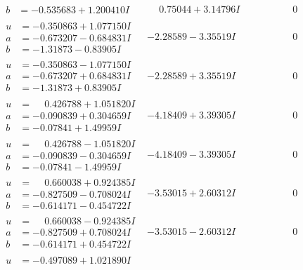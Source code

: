 \documentclass[1p]{elsarticle_modified}
\theoremstyle{definition}
\begin{document}
$$\begin{array}{c|c|c}
\begin{aligned}
b &= -0.535683 + 1.200410 I\end{aligned}
 & \phantom{-}0.75044 + 3.14796 I & \phantom{-0.000000 } 0 \\ \hline\begin{aligned}
u &= -0.350863 + 1.077150 I \\
a &= -0.673207 - 0.684831 I \\
b &= -1.31873 - 0.83905 I\end{aligned}
 & -2.28589 - 3.35519 I & \phantom{-0.000000 } 0 \\ \hline\begin{aligned}
u &= -0.350863 - 1.077150 I \\
a &= -0.673207 + 0.684831 I \\
b &= -1.31873 + 0.83905 I\end{aligned}
 & -2.28589 + 3.35519 I & \phantom{-0.000000 } 0 \\ \hline\begin{aligned}
u &= \phantom{-}0.426788 + 1.051820 I \\
a &= -0.090839 + 0.304659 I \\
b &= -0.07841 + 1.49959 I\end{aligned}
 & -4.18409 + 3.39305 I & \phantom{-0.000000 } 0 \\ \hline\begin{aligned}
u &= \phantom{-}0.426788 - 1.051820 I \\
a &= -0.090839 - 0.304659 I \\
b &= -0.07841 - 1.49959 I\end{aligned}
 & -4.18409 - 3.39305 I & \phantom{-0.000000 } 0 \\ \hline\begin{aligned}
u &= \phantom{-}0.660038 + 0.924385 I \\
a &= -0.827509 - 0.708024 I \\
b &= -0.614171 - 0.454722 I\end{aligned}
 & -3.53015 + 2.60312 I & \phantom{-0.000000 } 0 \\ \hline\begin{aligned}
u &= \phantom{-}0.660038 - 0.924385 I \\
a &= -0.827509 + 0.708024 I \\
b &= -0.614171 + 0.454722 I\end{aligned}
 & -3.53015 - 2.60312 I & \phantom{-0.000000 } 0 \\ \hline\begin{aligned}
u &= -0.497089 + 1.021890 I \\

\end{aligned}
\end{array}$$
\end{document}
